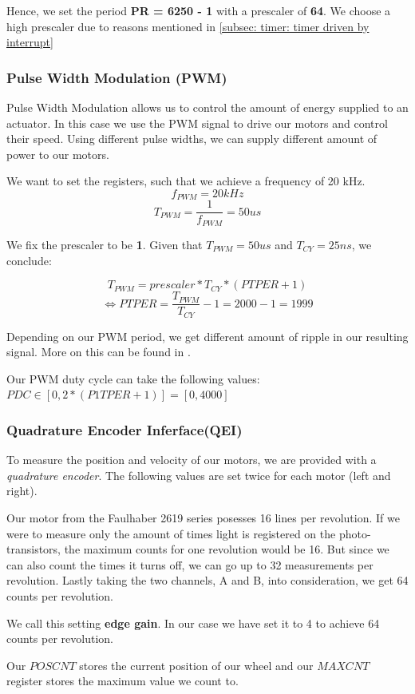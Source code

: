 Hence, we set the period \textbf{PR = 6250 - 1} with a prescaler of \textbf{64}. We choose a high prescaler due to reasons mentioned in \ref{subsec: timer: timer driven by interrupt}

\subsubsection*{Pulse Width Modulation (PWM)}

Pulse Width Modulation allows us to control the amount of energy supplied to an actuator. In this case we use the PWM signal to drive our motors and control their speed. Using different pulse widths, we can supply different amount of power to our motors. \cite{alex}

We want to set the registers, such that we achieve a frequency of 20 kHz.
$$f_{PWM} = 20 kHz$$
$$T_{PWM} = \frac{1}{f_{PWM}} = 50 us$$

We fix the prescaler to be \textbf{1}. Given that $T_{PWM} = 50 us$ and $T_{CY}=25 ns$, we conclude:

$$T_{PWM} = prescaler * T_{CY} * (PTPER + 1)$$
$$\iff PTPER = \frac{T_{PWM}}{T_{CY}} - 1  = 2000 - 1 = 1999$$

Depending on our PWM period, we get different amount of ripple in our resulting signal. More on this can be found in \cite[Chapter~5.1]{alex}.

Our PWM duty cycle can take the following values: $PDC \in [0, 2*(P1TPER + 1)] = [0, 4000]$


\subsubsection*{Quadrature Encoder Inferface(QEI)}
To measure the position and velocity of our motors, we are provided with a \textit{quadrature encoder}.
The following values are set twice for each motor (left and right).

Our motor from the Faulhaber 2619 series posesses 16 lines per revolution. If we were to measure only the amount of times light is registered on the photo-transistors, the maximum counts for one revolution would be 16. But since we can also count the times it turns off, we can go up to 32 measurements per revolution. Lastly taking the two channels, A and B, into consideration, we get 64 counts per revolution.

We call this setting \textbf{edge gain}. In our case we have set it to 4 to achieve 64 counts per revolution.

Our $POSCNT$ stores the current position of our wheel and our $MAXCNT$ register stores the maximum value we count to.

